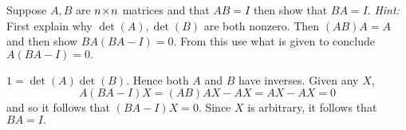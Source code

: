 
\begin{Exercise}[
name={},
title={}, 
difficulty=0,
origin={\cite{KK}}]
Suppose $A,B$ are $n \! \times \! n$ matrices and that $AB=I$ then show that
$BA=I.$ \textit{Hint:} First explain why
$\det \left( A\right) ,\det \left( B\right) $ are both nonzero. Then $\left(
AB\right) A=A$ and then show $BA\left( BA-I\right) =0.$ From this use what
is given to conclude $A\left( BA-I\right) =0.$ 
\end{Exercise}

\begin{Answer}
$1=\det \left( A\right) \det \left( B\right) $.
Hence both $A$ and $B$ have inverses. Given any $X$,
\[
A\left( BA-I\right) X=\left( AB\right) AX-AX=AX-AX = 0
\]
and so it follows that $\left( BA-I\right)X=0.$ Since $X$ is arbitrary, it follows that $BA=I.$
\end{Answer}
